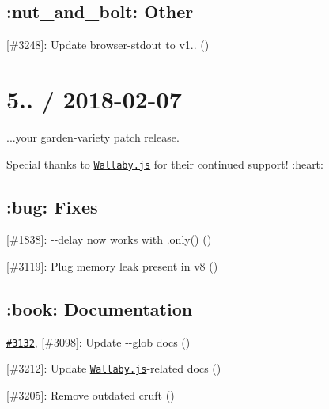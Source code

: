 \subsection*{\+:nut\+\_\+and\+\_\+bolt\+: Other}


\begin{DoxyItemize}
\item \mbox{[}\#3248\mbox{]}\+: Update {\ttfamily browser-\/stdout} to v1.. (\href{https://github.com/honzajavorek}{\tt })
\end{DoxyItemize}

\section*{5.. / 2018-\/02-\/07}

...your garden-\/variety patch release.

Special thanks to \href{https://wallabyjs.com}{\tt Wallaby.\+js} for their continued support! \+:heart\+:

\subsection*{\+:bug\+: Fixes}


\begin{DoxyItemize}
\item \mbox{[}\#1838\mbox{]}\+: {\ttfamily -\/-\/delay} now works with {\ttfamily .only()} (\href{https://github.com/silviom}{\tt })
\item \mbox{[}\#3119\mbox{]}\+: Plug memory leak present in v8 (\href{https://github.com/boneskull}{\tt })
\end{DoxyItemize}

\subsection*{\+:book\+: Documentation}


\begin{DoxyItemize}
\item \href{https://github.com/mochajs/mocha/issues/3132}{\tt \#3132}, \mbox{[}\#3098\mbox{]}\+: Update {\ttfamily -\/-\/glob} docs (\href{https://github.com/outsideris}{\tt })
\item \mbox{[}\#3212\mbox{]}\+: Update \href{https://wallabyjs.com}{\tt Wallaby.\+js}-\/related docs (\href{https://github.com/ArtemGovorov}{\tt })
\item \mbox{[}\#3205\mbox{]}\+: Remove outdated cruft (\href{https://github.com/boneskull}{\tt })
\end{DoxyItemize}

